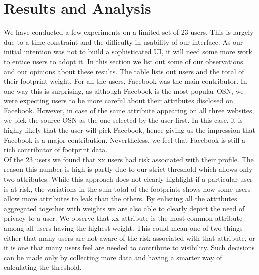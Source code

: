 \documentclass[10pt,conference]{IEEEtran}
\begin{document}
\section{Results and Analysis}
We have conducted a few experiments on a limited set of 23 users. This is largely due to a time constraint and the difficulty in usability of our interface. As our initial intention was not to build a sophisticated UI, it will need some more work to entice users to adopt it. In this section we list out some of our observations and our opinions about these results. The table lists out users and the total of their footprint weight. For all the users, Facebook was the main contributor. In one way this is surprising, as although Facebook is the most popular OSN, we were expecting users to be more careful about their attributes disclosed on Facebook. However, in case of the same attribute appearing on all three websites, we pick the source OSN as the one selected by the user first. In this case, it is highly likely that the user will pick Facebook, hence giving us the impression that Facebook is a major contribution. Nevertheless, we feel that Facebook is still a rich contributor of footprint data. \\

Of the 23 users we found that xx users had risk associated with their profile. The reason this number is high is partly due to our strict threshold which allows only two attributes. While this approach does not clearly highlight if a particular user is at risk, the variations in the sum total of the footprints shows how some users allow more attributes to leak than the others. By enlisting all the attributes aggregated together with weights we are also able to clearly depict the need of privacy to a user. We observe that xx attribute is the most common attribute among all users having the highest weight. This could mean one of two things - either that many users are not aware of the risk associated with that attribute, or it is one that many users feel are needed to contribute to visibility. Such decisions can be made only by collecting more data and having a smarter way of calculating the threshold.\\
\end{document}
